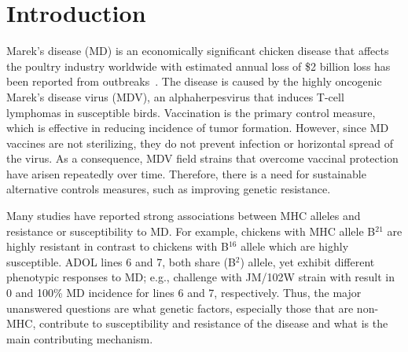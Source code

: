 \documentclass[10pt]{article}
\begin{document}
\section*{Introduction}

Marek's disease (MD) is an economically significant chicken disease that affects
the poultry industry worldwide with estimated annual loss of \$2 billion loss
has been reported from outbreaks~\cite{morrow2004marek}.  The disease is caused
by the highly oncogenic Marek's disease virus (MDV), an alphaherpesvirus that
induces T-cell lymphomas in susceptible birds.  Vaccination is the primary
control measure, which is effective in reducing incidence of tumor formation.
However, since MD vaccines are not sterilizing, they do not prevent infection or
horizontal spread of the virus.  As a consequence, MDV field strains that
overcome vaccinal protection have arisen repeatedly over time.  Therefore, there
is a need for sustainable alternative controls measures, such as improving
genetic resistance.

Many studies have reported strong associations between MHC alleles and
resistance or susceptibility to MD.  For example, chickens with MHC allele
B$^{21}$ are highly resistant in contrast to chickens with B$^{16}$ allele which
are highly susceptible.  ADOL lines 6 and 7, both share (B$^{2}$) allele, yet
exhibit different phenotypic responses to MD; e.g., challenge with JM/102W
strain with result in 0 and 100\% MD incidence for lines 6 and 7, respectively.
Thus, the major unanswered questions are what genetic factors, especially those
that are non-MHC, contribute to susceptibility and resistance of the disease and
what is the main contributing mechanism.
\end{document}
